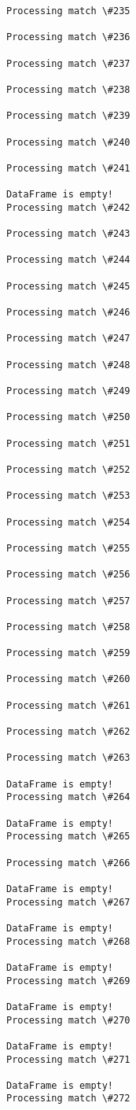 \documentclass[11pt]{article}
\begin{document}
\begin{Verbatim}[commandchars=\\\{\}]
Processing match \#235

Processing match \#236

Processing match \#237

Processing match \#238

Processing match \#239

Processing match \#240

Processing match \#241

DataFrame is empty!
Processing match \#242

Processing match \#243

Processing match \#244

Processing match \#245

Processing match \#246

Processing match \#247

Processing match \#248

Processing match \#249

Processing match \#250

Processing match \#251

Processing match \#252

Processing match \#253

Processing match \#254

Processing match \#255

Processing match \#256

Processing match \#257

Processing match \#258

Processing match \#259

Processing match \#260

Processing match \#261

Processing match \#262

Processing match \#263

DataFrame is empty!
Processing match \#264

DataFrame is empty!
Processing match \#265

Processing match \#266

DataFrame is empty!
Processing match \#267

DataFrame is empty!
Processing match \#268

DataFrame is empty!
Processing match \#269

DataFrame is empty!
Processing match \#270

DataFrame is empty!
Processing match \#271

DataFrame is empty!
Processing match \#272


\end{Verbatim}
\end{document}

